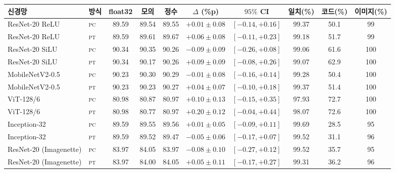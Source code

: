 \begin{tabular}{llcccccccc}
\toprule
신경망 & 방식 & float32 & 모의 & 정수 & $\Delta$ (\%p) & $95\%$ CI & 일치(\%) & 코드(\%) & 이미지(\%) \\
\midrule
ResNet-20 ReLU & \textsc{pc} & 89.59 & 89.54 & 89.55 & $+0.01\pm0.08$ & $[-0.14,+0.16]$ & 99.37 & 50.1 & 99 \\
ResNet-20 ReLU & \textsc{pt} & 89.59 & 89.61 & 89.67 & $+0.06\pm0.08$ & $[-0.11,+0.23]$ & 99.18 & 51.7 & 99 \\
ResNet-20 SiLU & \textsc{pc} & 90.34 & 90.35 & 90.26 & $-0.09\pm0.09$ & $[-0.26,+0.08]$ & 99.06 & 61.6 & 100 \\
ResNet-20 SiLU & \textsc{pt} & 90.34 & 90.17 & 90.26 & $+0.09\pm0.09$ & $[-0.08,+0.26]$ & 99.07 & 62.9 & 100 \\
MobileNetV2-0.5 & \textsc{pc} & 90.23 & 90.30 & 90.29 & $-0.01\pm0.08$ & $[-0.16,+0.14]$ & 99.28 & 50.4 & 100 \\
MobileNetV2-0.5 & \textsc{pt} & 90.23 & 90.23 & 90.27 & $+0.04\pm0.07$ & $[-0.10,+0.18]$ & 99.37 & 51.4 & 100 \\
ViT-128/6 & \textsc{pc} & 80.98 & 80.87 & 80.97 & $+0.10\pm0.13$ & $[-0.15,+0.35]$ & 97.93 & 72.7 & 100 \\
ViT-128/6 & \textsc{pt} & 80.98 & 80.77 & 80.97 & $+0.20\pm0.12$ & $[-0.04,+0.44]$ & 98.07 & 72.6 & 100 \\
Inception-32 & \textsc{pc} & 89.59 & 89.55 & 89.56 & $+0.01\pm0.05$ & $[-0.09,+0.11]$ & 99.69 & 28.5 & 95 \\
Inception-32 & \textsc{pt} & 89.59 & 89.52 & 89.47 & $-0.05\pm0.06$ & $[-0.17,+0.07]$ & 99.52 & 31.1 & 96 \\
ResNet-20 (Imagenette) & \textsc{pc} & 83.97 & 84.05 & 83.97 & $-0.08\pm0.10$ & $[-0.27,+0.12]$ & 99.52 & 35.7 & 95 \\
ResNet-20 (Imagenette) & \textsc{pt} & 83.97 & 84.00 & 84.05 & $+0.05\pm0.11$ & $[-0.17,+0.27]$ & 99.31 & 36.2 & 96 \\
\bottomrule
\end{tabular}
